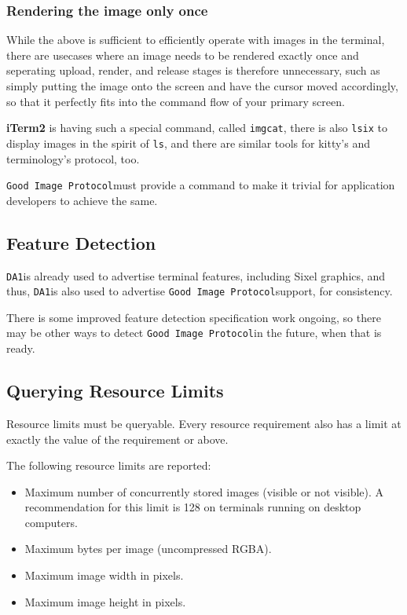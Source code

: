 \documentclass[a4paper]{article}
\newcommand{\code}[1]{\colorbox{light-gray}{\texttt{#1}}}
\newcommand{\DA}{\code{DA1}}
\newcommand{\GoodImageProtocol}{\code{Good Image Protocol}}
\begin{document}
\subsubsection*{Rendering the image only once} %

While the above is sufficient to efficiently operate with images in the terminal,
there are usecases where an image needs to be rendered exactly once and
seperating upload, render, and release stages is therefore unnecessary,
such as simply putting the image onto the screen and have the cursor moved
accordingly, so that it perfectly fits into the command flow of your primary screen.

\textbf{iTerm2} is having such a special command, called \code{imgcat},
there is also \code{lsix} to display images in the spirit of \code{ls},
and there are similar tools for kitty's and terminology's protocol, too.

\GoodImageProtocol must provide a command to make it trivial for application
developers to achieve the same.


\subsection{Feature Detection} %

\DA is already used to advertise terminal features, including Sixel graphics, and thus,
\DA is also used to advertise \GoodImageProtocol support, for consistency.

There is some improved feature detection specification work ongoing,
so there may be other ways to detect \GoodImageProtocol in the future, when that is ready.

\subsection{Querying Resource Limits} %

Resource limits must be queryable. Every resource requirement also has a limit
at exactly the value of the requirement or above.

The following resource limits are reported:

\begin{itemize}
    \item Maximum number of concurrently stored images (visible or not visible).
        A recommendation for this limit is 128 on terminals running on desktop computers.
    \item Maximum bytes per image (uncompressed RGBA).
    \item Maximum image width in pixels.
    \item Maximum image height in pixels.
\end{itemize}
\end{document}
